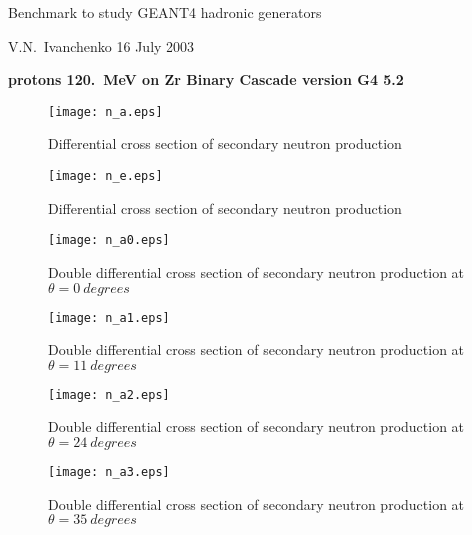 \documentclass[12pt]{article}
\begin{document}
\pagestyle{empty}

\begin{center}
{\large Benchmark to study GEANT4 hadronic generators}

\vspace*{5mm}
{V.N.~Ivanchenko 16 July 2003}

\vspace*{5mm}


\vspace*{5mm}

{\bf protons 120.~MeV on Zr Binary Cascade version G4 5.2}

\vspace*{1mm}


\end{center}


\begin{figure}[htbp]
\caption{Differential cross section of secondary neutron production}
\label{fig10}
\centerline{\texttt{[image: n\_a.eps]}}
\end{figure}

\begin{figure}[htbp]
\caption{Differential cross section of secondary neutron production}
\label{fig7}
\centerline{\texttt{[image: n\_e.eps]}}
\end{figure}




\clearpage


\begin{figure}[htbp]
\caption{Double differential cross section of secondary neutron production at $\theta = 0~degrees$}
\label{figa0}
\centerline{\texttt{[image: n\_a0.eps]}}
\end{figure}

\begin{figure}[htbp]
\caption{Double differential cross section of secondary neutron production at $\theta = 11~degrees$}
\label{figa1}
\centerline{\texttt{[image: n\_a1.eps]}}
\end{figure}

\begin{figure}[htbp]
\caption{Double differential cross section of secondary neutron production at $\theta = 24~degrees$}
\label{figa2}
\centerline{\texttt{[image: n\_a2.eps]}}
\end{figure}

\clearpage

\begin{figure}[htbp]
\caption{Double differential cross section of secondary neutron production at $\theta = 35~degrees$}
\label{figa3}
\centerline{\texttt{[image: n\_a3.eps]}}
\end{figure}
\end{document}
